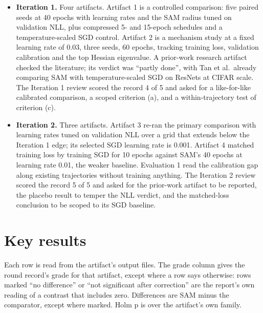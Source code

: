 \documentclass[10pt,letterpaper]{article}
\begin{document}
\begin{itemize}
\item \textbf{Iteration 1.} Four artifacts. Artifact 1 is a controlled comparison: five paired seeds at 40 epochs with learning rates and the SAM radius tuned on validation NLL, plus compressed 5- and 15-epoch schedules and a temperature-scaled SGD control. Artifact 2 is a mechanism study at a fixed learning rate of 0.03, three seeds, 60 epochs, tracking training loss, validation calibration and the top Hessian eigenvalue. A prior-work research artifact checked the literature; its verdict was ``partly done'', with Tan et al.\ already comparing SAM with temperature-scaled SGD on ResNets at CIFAR scale. The Iteration 1 review scored the record 4 of 5 and asked for a like-for-like calibrated comparison, a scoped criterion (a), and a within-trajectory test of criterion (c).
\item \textbf{Iteration 2.} Three artifacts. Artifact 3 re-ran the primary comparison with learning rates tuned on validation NLL over a grid that extends below the Iteration 1 edge; its selected SGD learning rate is 0.001. Artifact 4 matched training loss by training SGD for 10 epochs against SAM's 40 epochs at learning rate 0.01, the weaker baseline. Evaluation 1 read the calibration gap along existing trajectories without training anything. The Iteration 2 review scored the record 5 of 5 and asked for the prior-work artifact to be reported, the placebo result to temper the NLL verdict, and the matched-loss conclusion to be scoped to its SGD baseline.
\end{itemize}

\section{Key results}

Each row is read from the artifact's output files. The grade column gives the round record's grade for that artifact, except where a row says otherwise: rows marked ``no difference'' or ``not significant after correction'' are the report's own reading of a contrast that includes zero. Differences are SAM minus the comparator, except where marked. Holm p is over the artifact's own family.
\end{document}
